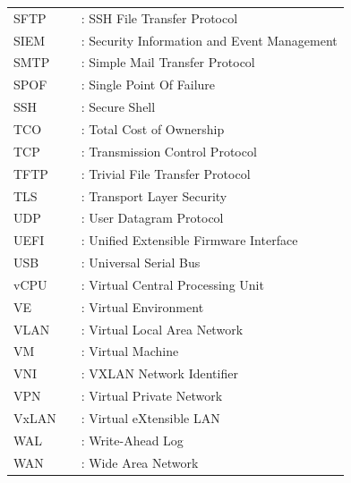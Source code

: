 \begin{longtable}{lcl}
SFTP && : SSH File Transfer Protocol\\
SIEM && : Security Information and Event Management\\
SMTP && : Simple Mail Transfer Protocol\\
SPOF && : Single Point Of Failure\\
SSH  && : Secure Shell\\
TCO  && : Total Cost of Ownership\\
TCP  && : Transmission Control Protocol\\
TFTP && : Trivial File Transfer Protocol\\
TLS  && : Transport Layer Security\\
UDP  && : User Datagram Protocol\\
UEFI && : Unified Extensible Firmware Interface\\
USB  && : Universal Serial Bus\\
vCPU && : Virtual Central Processing Unit\\
VE   && : Virtual Environment\\
VLAN && : Virtual Local Area Network\\
VM   && : Virtual Machine\\
VNI  && : VXLAN Network Identifier\\
VPN  && : Virtual Private Network\\
VxLAN && : Virtual eXtensible LAN\\
WAL  && : Write-Ahead Log\\
WAN  && : Wide Area Network\\
\end{longtable}

